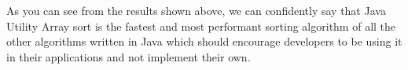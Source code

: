 As you can see from the results shown above, we can confidently say that Java Utility Array sort is the fastest and most performant sorting algorithm of all the other algorithms written in Java which should encourage developers to be using it in their applications and not implement their own.